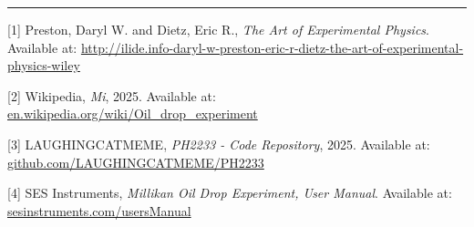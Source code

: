\documentclass[%
sor,
 jor,
 amsmath,amssymb,
 reprint,%
]{revtex4-2}
\begin{document}
\noindent\rule{\linewidth}{0.4pt}





\newpage



\begin{thebibliography}{9}

[1] Preston, Daryl W. and Dietz, Eric R., \emph{The Art of Experimental Physics}. Available at: \url{http://ilide.info-daryl-w-preston-eric-r-dietz-the-art-of-experimental-physics-wiley}

[2] Wikipedia, \emph{Mi}, 2025. Available at: \url{en.wikipedia.org/wiki/Oil_drop_experiment}

[3] LAUGHINGCATMEME, \emph{PH2233 - Code Repository}, 2025. Available at: \url{github.com/LAUGHINGCATMEME/PH2233}

[4] SES Instruments, \emph{Millikan Oil Drop Experiment, User Manual}. Available at: \url{sesinstruments.com/usersManual}

\end{thebibliography}
\end{document}
